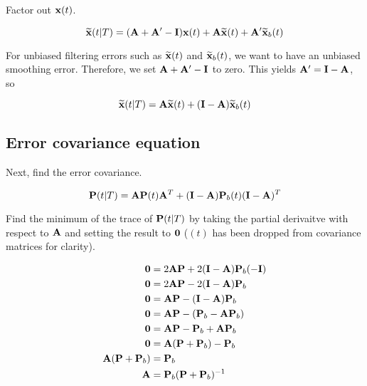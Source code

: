 Factor out $\mathbf{x}(t)$.

\begin{equation*}
  \widetilde{\mathbf{x}}(t|T) = (\mathbf{A} + \mathbf{A}' - \mathbf{I})\mathbf{x}(t) +
    \mathbf{A}\widetilde{\mathbf{x}}(t) + \mathbf{A}'\widetilde{\mathbf{x}}_b(t)
\end{equation*}

For unbiased filtering errors such as $\widetilde{\mathbf{x}}(t)$ and
$\widetilde{\mathbf{x}}_b(t)$, we want to have an unbiased smoothing error.
Therefore, we set $\mathbf{A} + \mathbf{A}' - \mathbf{I}$ to zero. This yields
$\mathbf{A}' = \mathbf{I} - \mathbf{A}$, so

\begin{equation*}
  \widetilde{\mathbf{x}}(t|T) = \mathbf{A}\widetilde{\mathbf{x}}(t) +
    (\mathbf{I} - \mathbf{A})\widetilde{\mathbf{x}}_b(t)
\end{equation*}

\subsection{Error covariance equation}

Next, find the error covariance.

\begin{equation}
  \mathbf{P}(t|T) = \mathbf{A}\mathbf{P}(t)\mathbf{A}^T +
    (\mathbf{I} - \mathbf{A})\mathbf{P}_b(t)(\mathbf{I} - \mathbf{A})^T
    \label{eq:ks_error_cov_a}
\end{equation}

Find the minimum of the trace of $\mathbf{P}(t|T)$ by taking the partial derivaitve
with respect to $\mathbf{A}$ and setting the result to $\mathbf{0}$ ($(t)$ has been
dropped from covariance matrices for clarity).

\begin{align}
  \mathbf{0} &= 2\mathbf{A}\mathbf{P} + 2(\mathbf{I} - \mathbf{A})\mathbf{P}_b(-\mathbf{I}) \nonumber
    \\
  \mathbf{0} &= 2\mathbf{A}\mathbf{P} - 2(\mathbf{I} - \mathbf{A})\mathbf{P}_b \nonumber \\
  \mathbf{0} &= \mathbf{A}\mathbf{P} - (\mathbf{I} - \mathbf{A})\mathbf{P}_b \nonumber \\
  \mathbf{0} &= \mathbf{A}\mathbf{P} - (\mathbf{P}_b - \mathbf{A}\mathbf{P}_b) \nonumber \\
  \mathbf{0} &= \mathbf{A}\mathbf{P} - \mathbf{P}_b + \mathbf{A}\mathbf{P}_b \nonumber \\
  \mathbf{0} &= \mathbf{A}(\mathbf{P} + \mathbf{P}_b) - \mathbf{P}_b \nonumber \\
  \mathbf{A}(\mathbf{P} + \mathbf{P}_b) &= \mathbf{P}_b \nonumber \\
  \mathbf{A} &= \mathbf{P}_b(\mathbf{P} + \mathbf{P}_b)^{-1} \label{eq:ks_a1}
\end{align}

